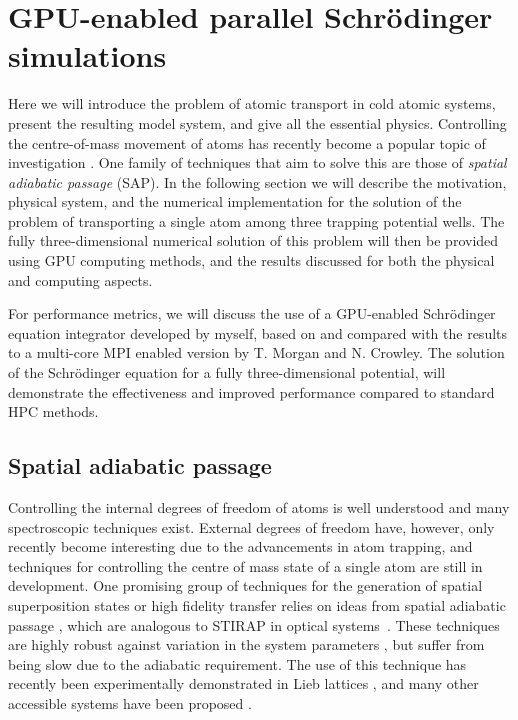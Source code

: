 \section{GPU-enabled parallel Schr\"odinger simulations}
\label{sec:3D_Stirap_parallel_Schrodinger_simulations}

Here we will introduce the problem of atomic transport in cold atomic systems, present the resulting model system, and give all the essential physics. Controlling the centre-of-mass movement of atoms has recently become a popular topic of investigation \cite{AO:SAP_REVIEW_2016}. One family of techniques that aim to solve this are those of \textit{spatial adiabatic passage} (SAP). In the following section we will describe the motivation, physical system, and the numerical implementation for the solution of the problem of transporting a single atom among three trapping potential wells. The fully three-dimensional numerical solution of this problem will then be provided using GPU computing methods, and the results discussed for both the physical and computing aspects.

For performance metrics, we will discuss the use of a GPU-enabled Schr\"odinger equation integrator developed by myself, based on and compared with the results to a multi-core MPI enabled version by T. Morgan and N. Crowley. The solution of the Schr\"odinger equation for a fully three-dimensional potential, will demonstrate the effectiveness and improved performance compared to standard HPC methods.

\subsection{Spatial adiabatic passage}
Controlling the internal degrees of freedom of atoms is well understood and many spectroscopic techniques exist. External degrees of freedom have, however, only recently become interesting due to the advancements in atom trapping, and techniques for controlling the centre of mass state of a single atom are still in development. One promising group of techniques for the generation of spatial superposition states or high fidelity transfer relies on ideas from spatial adiabatic passage \cite{AO:SAP_REVIEW_2016}, which are analogous to STIRAP in optical systems~\cite{AO:Bergmann_jcp_2015}. These techniques are highly robust against variation in the system parameters \cite{Eckert:04}, but suffer from being slow due to the adiabatic requirement. The use of this technique has recently been experimentally demonstrated in Lieb lattices \cite{AO:Taie_oist_2016}, and many other accessible systems have been proposed \cite{Eckert:06,Morgan:11,Kohler:13}.

